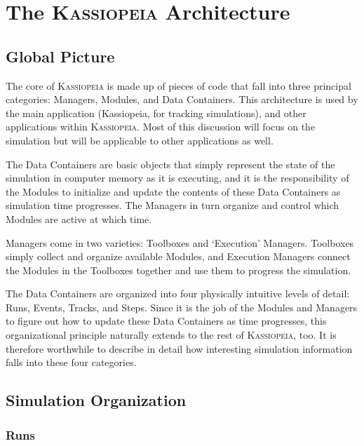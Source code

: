 \chapter{The \textsc{Kassiopeia} Architecture}\label{ch:architecture}

\section{Global Picture}
\label{arch:globalpicture}

The core of \textsc{Kassiopeia} is made up of pieces of code that fall into three principal categories:  Managers, Modules, and Data Containers.  This architecture is used by the main application (Kassiopeia, for tracking simulations), and other applications within \textsc{Kassiopeia}.  Most of this discussion will focus on the simulation but will be applicable to other applications as well.

The Data Containers are basic objects that simply represent the state of the simulation in computer memory as it is executing, and it is the responsibility of the Modules to initialize and update the contents of these Data Containers as simulation time progresses.  The Managers in turn organize and control which Modules are active at which time.

Managers come in two varieties: Toolboxes and `Execution' Managers.  Toolboxes simply collect and organize available Modules, and Execution Managers connect the Modules in the Toolboxes together and use them to progress the simulation.   

The Data Containers are organized into four physically intuitive levels of detail:  Runs, Events, Tracks, and Steps.  Since it is the job of the Modules and Managers to figure out how to update these Data Containers as time progresses, this organizational principle naturally extends to the rest of \textsc{Kassiopeia}, too.  It is therefore worthwhile to describe in detail how interesting simulation information falls into these four categories.

\section{Simulation Organization}
\label{arch:simorganization}

\subsection{Runs}
\label{arch:runs}

